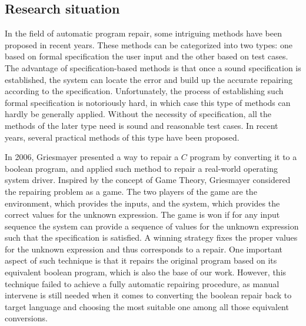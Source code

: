 \documentclass[10pt,journal,final,]{article}
\theoremstyle{definition}
\begin{document}
\subsection{Research situation}
\label{section:ResearchSituation}
In the field of automatic program repair, some intriguing methods have been proposed in recent years.
These methods can be categorized into two types: one based on formal specification the user input and the other based on test cases.
The advantage of specification-based methods is that once a sound specification is established, the system can locate the error and build up the accurate repairing according to the specification.
Unfortunately, the process of establishing such formal specification is notoriously hard, in which case this type of methods can hardly be generally applied.
Without the necessity of specification, all the methods of the later type need is sound and reasonable test cases. In recent years, several practical methods of this type have been proposed.

In 2006, Griesmayer presented a way to repair a $C$ program by converting it to a boolean program, and applied such method to repair a real-world operating system driver\cite{RoBPwaAtC}.
Inspired by the concept of Game Theory, Griesmayer considered the repairing problem as a game\cite{PRaaG}. The two players of the game are the environment, which provides the inputs, and the system, which provides the correct values for the unknown expression. The game is won if for any input sequence the system can provide a sequence of values for the unknown expression such that the specification is satisfied. A winning strategy fixes the proper values for the unknown expression and thus corresponds to a repair.
One important aspect of such technique is that it repairs the original program based on its equivalent boolean program, which is also the base of our work.
However, this technique failed to achieve a fully automatic repairing procedure, as manual intervene is still needed when it comes to converting the boolean repair back to target language and choosing the most suitable one among all those equivalent conversions.
\end{document}
